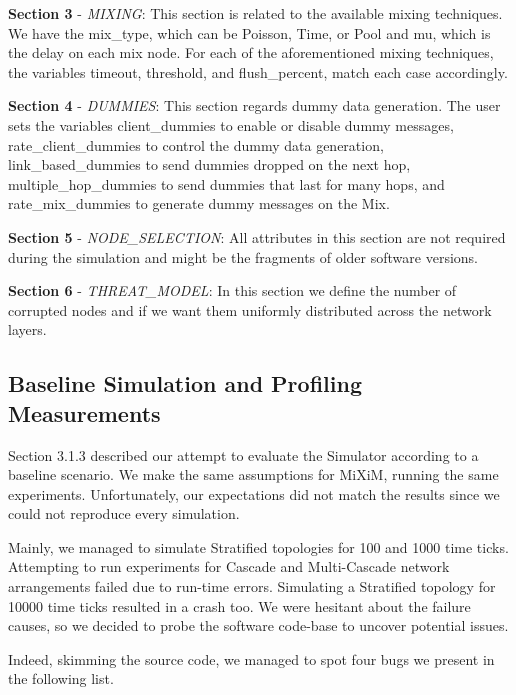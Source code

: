 \documentclass[logo,msc,cyber]{infthesis}   %
\begin{document}
\textbf{Section 3} - \emph{MIXING}: This section is related to the
available mixing techniques. We have the mix\_type, which can be Poisson,
Time, or Pool and mu, which is the delay on each mix node. For each of the
aforementioned mixing techniques, the variables timeout, threshold, and
flush\_percent, match each case accordingly.

\textbf{Section 4} - \emph{DUMMIES}: This section regards dummy data
generation. The user sets the variables client\_dummies to enable or
disable dummy messages, rate\_client\_dummies to control the dummy data
generation, link\_based\_dummies to send dummies dropped on the next hop,
multiple\_hop\_dummies to send dummies that last for many hops, and
rate\_mix\_dummies to generate dummy messages on the Mix.

\textbf{Section 5} - \emph{NODE\_SELECTION}: All attributes in this
section are not required during the simulation and might be the fragments of
older software versions. 

\textbf{Section 6} - \emph{THREAT\_MODEL}: In this section we define the number
of corrupted nodes and if we want them uniformly distributed across the network
layers.


\subsection{Baseline Simulation and Profiling Measurements}

Section 3.1.3 described our attempt to evaluate the Simulator according to a
baseline scenario. We make the same assumptions for MiXiM, running the same
experiments. Unfortunately, our expectations did not match the results since we
could not reproduce every simulation.

Mainly, we managed to simulate Stratified topologies for 100 and 1000 time
ticks. Attempting to run experiments for Cascade and Multi-Cascade network
arrangements failed due to run-time errors. Simulating a Stratified topology for
10000 time ticks resulted in a crash too. We were hesitant about the failure
causes, so we decided to probe the software code-base to uncover potential
issues.

Indeed, skimming the source code, we managed to spot four bugs we present in the following list. 
\end{document}
